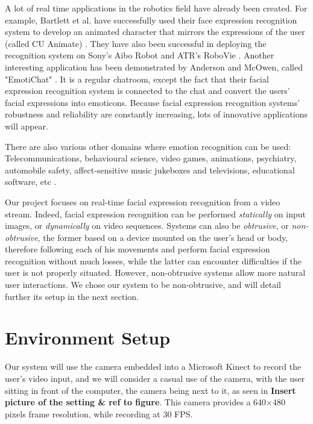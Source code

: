 \noindent A lot of real time applications in the robotics field have already been created. For example, Bartlett et al. have successfully used their face expression recognition system to develop an animated character that mirrors the expressions of the user (called CU Animate) \cite{BAR03}. They have also been successful in deploying the recognition system on Sony's Aibo Robot and ATR's RoboVie \cite{BAR03}. Another interesting application has been demonstrated by Anderson and McOwen, called "EmotiChat" \cite{AND06}. It is a regular chatroom, except the fact that their facial expression recognition system is connected to the chat and convert the users' facial expressions into emoticons. Because facial expression recognition systems' robustness and reliability are constantly increasing, lots of innovative applications will appear.
\newline

\noindent There are also various other domains where emotion recognition can be used: Telecommunications, behavioural science, video games, animations, psychiatry, automobile safety, affect-sensitive music jukeboxes and televisions, educational software, etc \cite{BET12}.
\newline

\noindent Our project focuses on real-time facial expression recognition from a video stream. Indeed, facial expression recognition can be performed \textit{statically} on input images, or \textit{dynamically} on video sequences. Systems can also be \textit{obtrusive}, or \textit{non-obtrusive}, the former based on a device mounted on the user's head or body, therefore following each of his movements and perform facial expression recognition without much losses, while the latter can encounter difficulties if the user is not properly situated. However, non-obtrusive systems allow more natural user interactions. We chose our system to be non-obtrusive, and will detail further its setup in the next section.
\newline

\section{Environment Setup}

\vspace{\baselineskip}
\noindent Our system will use the camera embedded into a Microsoft Kinect to record the user's video input, and we will consider a casual use of the camera, with the user sitting in front of the computer, the camera being next to it, as seen in \textbf{\color{red} Insert picture of the setting \& ref to figure}. This camera provides a 640$\times$480 pixels frame resolution, while recording at 30 FPS.
\newline



